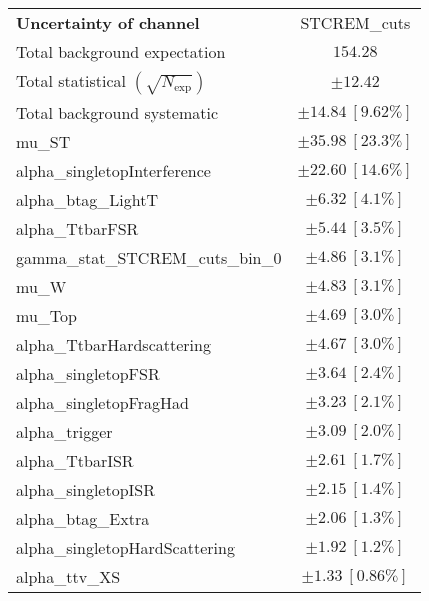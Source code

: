 
\begin{table}
\begin{center}
\setlength{\tabcolsep}{0.0pc}
\begin{tabular*}{\textwidth}{@{\extracolsep{\fill}}lc}
\noalign{\smallskip}\hline\noalign{\smallskip}
{\textbf{Uncertainty of channel}}                                    & STCREM\_cuts            \\
\noalign{\smallskip}\hline\noalign{\smallskip}
Total background expectation             &  $154.28$       \\
\noalign{\smallskip}\hline\noalign{\smallskip}
Total statistical $(\sqrt{N_{\mathrm{exp}}})$              & $\pm 12.42$       \\
Total background systematic               & $\pm 14.84\ [9.62\%] $             \\
\noalign{\smallskip}\hline\noalign{\smallskip}
\noalign{\smallskip}\hline\noalign{\smallskip}
mu\_ST         & $\pm 35.98\ [23.3\%] $       \\
alpha\_singletopInterference         & $\pm 22.60\ [14.6\%] $       \\
alpha\_btag\_LightT         & $\pm 6.32\ [4.1\%] $       \\
alpha\_TtbarFSR         & $\pm 5.44\ [3.5\%] $       \\
gamma\_stat\_STCREM\_cuts\_bin\_0         & $\pm 4.86\ [3.1\%] $       \\
mu\_W         & $\pm 4.83\ [3.1\%] $       \\
mu\_Top         & $\pm 4.69\ [3.0\%] $       \\
alpha\_TtbarHardscattering         & $\pm 4.67\ [3.0\%] $       \\
alpha\_singletopFSR         & $\pm 3.64\ [2.4\%] $       \\
alpha\_singletopFragHad         & $\pm 3.23\ [2.1\%] $       \\
alpha\_trigger         & $\pm 3.09\ [2.0\%] $       \\
alpha\_TtbarISR         & $\pm 2.61\ [1.7\%] $       \\
alpha\_singletopISR         & $\pm 2.15\ [1.4\%] $       \\
alpha\_btag\_Extra         & $\pm 2.06\ [1.3\%] $       \\
alpha\_singletopHardScattering         & $\pm 1.92\ [1.2\%] $       \\
alpha\_ttv\_XS         & $\pm 1.33\ [0.86\%] $       \\

\end{tabular*}
\end{center}
\end{table}
